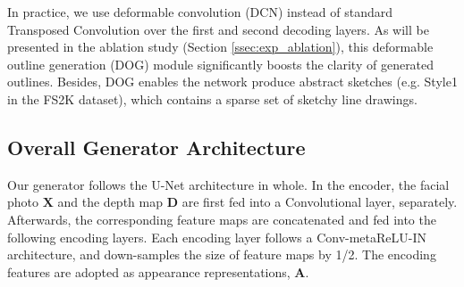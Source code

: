 \documentclass[10pt,twocolumn,letterpaper]{article}
\begin{document}
In practice, we use deformable convolution (DCN) \cite{Dai2017Deformable} instead of standard Transposed Convolution over the first and second decoding layers. 
As will be presented in the ablation study (Section \ref{ssec:exp_ablation}), this deformable outline generation (DOG) module significantly boosts the clarity of generated outlines. Besides, DOG enables the network produce abstract sketches (e.g. Style1 in the FS2K dataset), which contains a sparse set of sketchy line drawings.  


\subsection{Overall Generator Architecture}
\label{ssec:gen}

Our generator follows the U-Net architecture \cite{Isola2017Pix2Pix} in whole. 
In the encoder, the facial photo $\mathbf{X}$ and the depth map $\mathbf{D}$ are first fed into a Convolutional layer, separately. Afterwards, the corresponding feature maps are concatenated and fed into the following encoding layers. Each encoding layer follows a Conv-metaReLU-IN architecture, and down-samples the size of feature maps by 1/2. The encoding features are adopted as appearance representations, $\mathbf{A}$.
\end{document}
